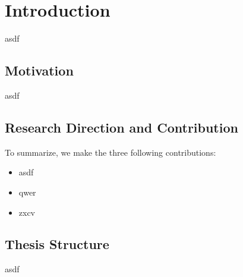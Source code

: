 \chapter{Introduction}
\label{sec:intro}

asdf

\section{Motivation}

asdf



\section{Research Direction and Contribution}

To summarize, we make the three following contributions:
\begin{itemize}
\item asdf
\item qwer
\item zxcv
\end{itemize}

\section{Thesis Structure}

asdf
